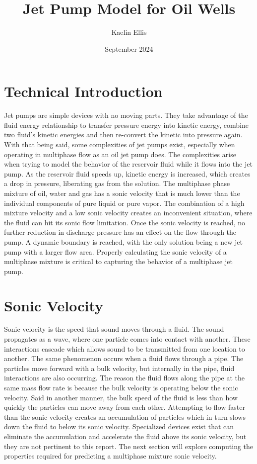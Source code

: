 \documentclass[12 pt]{report}
\title{Jet Pump Model for Oil Wells}
\author{Kaelin Ellis}
\date{September 2024}
\begin{document}
\maketitle

\section{Technical Introduction}

Jet pumps are simple devices with no moving parts. They take advantage of the fluid energy relationship to transfer pressure energy into kinetic energy, combine two fluid’s kinetic energies and then re-convert the kinetic into pressure again. With that being said, some complexities of jet pumps exist, especially when operating in multiphase flow as an oil jet pump does. The complexities arise when trying to model the behavior of the reservoir fluid while it flows into the jet pump. As the reservoir fluid speeds up, kinetic energy is increased, which creates a drop in pressure, liberating gas from the solution. The multiphase phase mixture of oil, water and gas has a sonic velocity that is much lower than the individual components of pure liquid or pure vapor.  The combination of a high mixture velocity and a low sonic velocity creates an inconvenient situation, where the fluid can hit its sonic flow limitation. Once the sonic velocity is reached, no further reduction in discharge pressure has an effect on the flow through the pump. A dynamic boundary is reached, with the only solution being a new jet pump with a larger flow area. Properly calculating the sonic velocity of a multiphase mixture is critical to capturing the behavior of a multiphase jet pump.

\section{Sonic Velocity}

Sonic velocity is the speed that sound moves through a fluid. The sound propagates as a wave, where one particle comes into contact with another. These interactions cascade which allows sound to be transmitted from one location to another. The same phenomenon occurs when a fluid flows through a pipe. The particles move forward with a bulk velocity, but internally in the pipe, fluid interactions are also occurring. The reason the fluid flows along the pipe at the same mass flow rate is because the bulk velocity is operating below the sonic velocity. Said in another manner, the bulk speed of the fluid is less than how quickly the particles can move away from each other. Attempting to flow faster than the sonic velocity creates an accumulation of particles which in turn slows down the fluid to below its sonic velocity. Specialized devices exist that can eliminate the accumulation and accelerate the fluid above its sonic velocity, but they are not pertinent to this report. The next section will explore computing the properties required for predicting a multiphase mixture sonic velocity.
\end{document}
